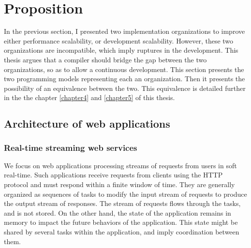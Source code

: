 \section{Proposition} \label{chapter2:proposition}

In the previous section, I presented two implementation organizations to improve either performance scalability, or development scalability.
However, these two organizations are incompatible, which imply ruptures in the development.
This thesis argues that a compiler should bridge the gap between the two organizations, so as to allow a continuous development.
This section presents the two programming models representing each an organization.
Then it presents the possibility of an equivalence between the two.
This equivalence is detailed further in the the chapter \ref{chapter4} and \ref{chapter5} of this thesis.


\subsection{Architecture of web applications}

\subsubsection{Real-time streaming web services}


We focus on web applications processing streams of requests from users in soft real-time.
Such applications receive requests from clients using the HTTP protocol and must respond within a finite window of time.
They are generally organized as sequences of tasks to modify the input stream of requests to produce the output stream of responses.
The stream of requests flows through the tasks, and is not stored.
On the other hand, the state of the application remains in memory to impact the future behaviors of the application.
This state might be shared by several tasks within the application, and imply coordination between them.

